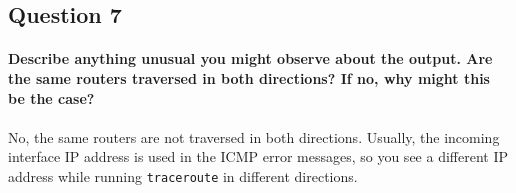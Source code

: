 \documentclass[12pt,a4paper]{article}
\begin{document}
			\subsection{Question 7}
				\paragraph{Describe anything unusual you might observe about the output. Are the same routers traversed in both directions? If no, why might this be the case?}
				\paragraph{}
					No, the same routers are not traversed in both directions. Usually, the incoming interface IP address is used in the ICMP error messages, so you see a different IP address while running \verb|traceroute| in different directions.
\end{document}
